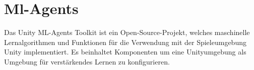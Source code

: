 {\section{Ml-Agents}}
\label{sec:mlagents}
Das Unity ML-Agents Toolkit ist ein Open-Source-Projekt, welches maschinelle Lernalgorithmen und Funktionen für die Verwendung mit der Spieleumgebung Unity implementiert. Es beinhaltet Komponenten um eine Unityumgebung als Umgebung für verstärkendes Lernen zu konfigurieren.\cite{juliani2020}




